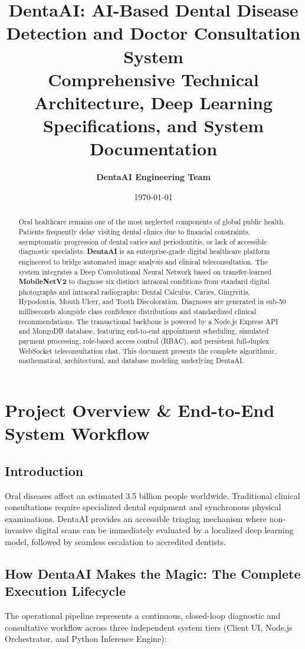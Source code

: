 \documentclass[12pt,a4paper]{report}
\title{\textbf{\LARGE DentaAI: AI-Based Dental Disease Detection and Doctor Consultation System}\\[1ex]
\large Comprehensive Technical Architecture, Deep Learning Specifications, and System Documentation}
\author{\textbf{DentaAI Engineering Team}}
\date{\today}
\begin{document}
\maketitle

\begin{abstract}
Oral healthcare remains one of the most neglected components of global public health. Patients frequently delay visiting dental clinics due to financial constraints, asymptomatic progression of dental caries and periodontitis, or lack of accessible diagnostic specialists. \textbf{DentaAI} is an enterprise-grade digital healthcare platform engineered to bridge automated image analysis and clinical teleconsultation. The system integrates a Deep Convolutional Neural Network based on transfer-learned \textbf{MobileNetV2} to diagnose six distinct intraoral conditions from standard digital photographs and intraoral radiographs: Dental Calculus, Caries, Gingivitis, Hypodontia, Mouth Ulcer, and Tooth Discoloration. Diagnoses are generated in sub-50 milliseconds alongside class confidence distributions and standardized clinical recommendations. The transactional backbone is powered by a Node.js Express API and MongoDB database, featuring end-to-end appointment scheduling, simulated payment processing, role-based access control (RBAC), and persistent full-duplex WebSocket teleconsultation chat. This document presents the complete algorithmic, mathematical, architectural, and database modeling underlying DentaAI.
\end{abstract}

\tableofcontents
\newpage

\chapter{Project Overview \& End-to-End System Workflow}

\section{Introduction}
Oral diseases affect an estimated 3.5 billion people worldwide. Traditional clinical consultations require specialized dental equipment and synchronous physical examinations. DentaAI provides an accessible triaging mechanism where non-invasive digital scans can be immediately evaluated by a localized deep learning model, followed by seamless escalation to accredited dentists.

\section{How DentaAI Makes the Magic: The Complete Execution Lifecycle}
The operational pipeline represents a continuous, closed-loop diagnostic and consultative workflow across three independent system tiers (Client UI, Node.js Orchestrator, and Python Inference Engine):
\end{document}
